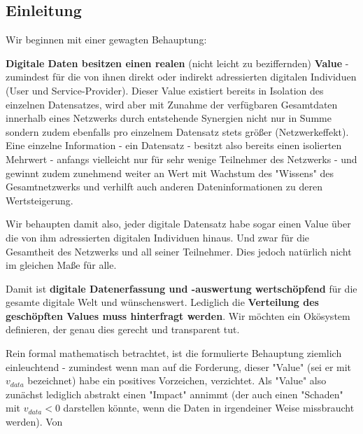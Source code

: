 
\subsection{Einleitung}
\label{sec:eco_einleitung}

Wir beginnen mit einer gewagten Behauptung:

\vspace{0.2cm}

\begin{Hypothese}
\textbf{Digitale Daten besitzen einen realen} (nicht leicht zu beziffernden) \textbf{Value} - zumindest für die von ihnen direkt oder indirekt adressierten digitalen Individuen (User und Service-Provider). Dieser Value existiert bereits in Isolation des einzelnen Datensatzes, wird aber mit Zunahme der verfügbaren Gesamtdaten innerhalb eines Netzwerks durch entstehende Synergien nicht nur in Summe sondern zudem ebenfalls pro einzelnem Datensatz stets größer (Netzwerkeffekt). Eine einzelne Information - ein Datensatz - besitzt also bereits einen isolierten Mehrwert - anfangs vielleicht nur für sehr wenige Teilnehmer des Netzwerks - und gewinnt zudem zunehmend weiter an Wert mit Wachstum des "Wissens" des Gesamtnetzwerks und verhilft auch anderen Dateninformationen zu deren Wertsteigerung.

Wir behaupten damit also, jeder digitale Datensatz habe sogar einen Value über die von ihm adressierten digitalen Individuen hinaus. Und zwar für die Gesamtheit des Netzwerks und all seiner Teilnehmer. Dies jedoch natürlich nicht im gleichen Maße für alle.

\vspace{0.1cm}

Damit ist \textbf{digitale Datenerfassung und -auswertung wertschöpfend} für die gesamte digitale Welt und wünschenswert. Lediglich die \textbf{Verteilung des geschöpften Values muss hinterfragt werden}. Wir möchten ein Okösystem definieren, der genau dies gerecht und transparent tut.
 
\end{Hypothese}

\vspace{0.3cm}
Rein formal mathematisch betrachtet, ist die formulierte Behauptung ziemlich einleuchtend - zumindest wenn man auf die Forderung, dieser "Value" (sei er mit $v_{data}$ bezeichnet) habe ein positives Vorzeichen, verzichtet. Als "Value" also zunächst lediglich abstrakt einen "Impact" annimmt (der auch einen "Schaden" mit $v_{data} < 0$ darstellen könnte, wenn die Daten in irgendeiner Weise missbraucht werden). Von 

